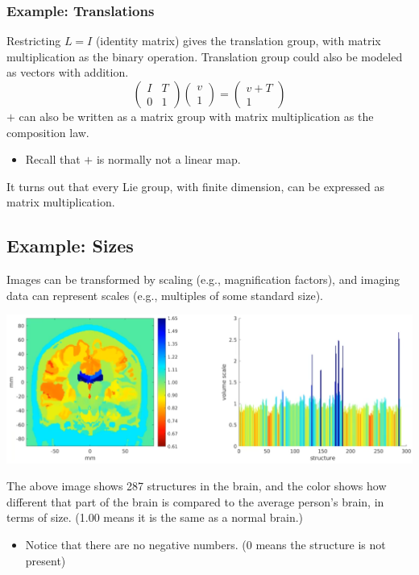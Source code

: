 \documentclass[10pt]{article}
\begin{document}
\subsubsection*{Example: Translations}
Restricting $L = I$ (identity matrix) gives the translation group, with matrix multiplication as the binary operation.  Translation group could also be modeled as vectors with addition.
\[\begin{pmatrix} I & T \\ 0 & 1 \end{pmatrix} \begin{pmatrix} v \\ 1 \end{pmatrix} = \begin{pmatrix} v + T \\ 1 \end{pmatrix}\]
$+$ can also be written as a matrix group with matrix multiplication as the composition law.
\begin{itemize}
    \item Recall that $+$ is normally not a linear map.
\end{itemize}
It turns out that every Lie group, with finite dimension, can be expressed as matrix multiplication.

\subsection*{Example: Sizes}
Images can be transformed by scaling (e.g., magnification factors), and imaging data can represent scales (e.g., multiples of some standard size).
\begin{center}
    \includegraphics[width=\textwidth]{W5_4.png}
\end{center}
The above image shows 287 structures in the brain, and the color shows how different that part of the brain is compared to the average person's brain, in terms of size.  (1.00 means it is the same as a normal brain.)
\begin{itemize}
    \item Notice that there are no negative numbers.  (0 means the structure is not present)
\end{itemize}
\end{document}
